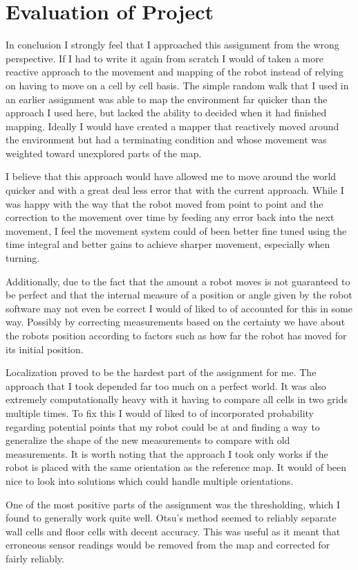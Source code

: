 \documentclass{article}
\begin{document}
\section{Evaluation of Project}
In conclusion I strongly feel that I approached this assignment from the wrong perspective. If I had to write it again from scratch I would of taken a more reactive approach to the movement and mapping of the robot instead of relying on having to move on a cell by cell basis. The simple random walk that I used in an earlier assignment was able to map the environment far quicker than the approach I used here, but lacked the ability to decided when it had finished mapping. Ideally I would have created a mapper that reactively moved around the environment but had a terminating condition and whose movement was weighted toward unexplored parts of the map. 

I believe that this approach would have allowed me to move around the world quicker and with a great deal less error that with the current approach. While I was happy with the way that the robot moved from point to point and the correction to the movement over time by feeding any error back into the next movement, I feel the movement system could of been better fine tuned using the time integral and better gains to achieve sharper movement, especially when turning.

Additionally, due to the fact that the amount a robot moves is not guaranteed to be perfect and that the internal measure of a position or angle given by the robot software may not even be correct I would of liked to of accounted for this in some way. Possibly by correcting measurements based on the certainty we have about the robots position according to factors such as how far the robot has moved for its initial position.

Localization proved to be the hardest part of the assignment for me. The approach that I took depended far too much on a perfect world. It was also extremely computationally heavy with it having to compare all cells in two grids multiple times. To fix this I would of liked to of incorporated probability regarding potential points that my robot could be at and finding a way to generalize the shape of the new measurements to compare with old measurements. It is worth noting that the approach I took only works if the robot is placed with the same orientation as the reference map. It would of been nice to look into solutions which could handle multiple orientations.

One of the most positive parts of the assignment was the thresholding, which I found to generally work quite well. Otsu's method seemed to reliably separate wall cells and floor cells with decent accuracy. This was useful as it meant that erroneous sensor readings would be removed from the map and corrected for fairly reliably.
\end{document}
